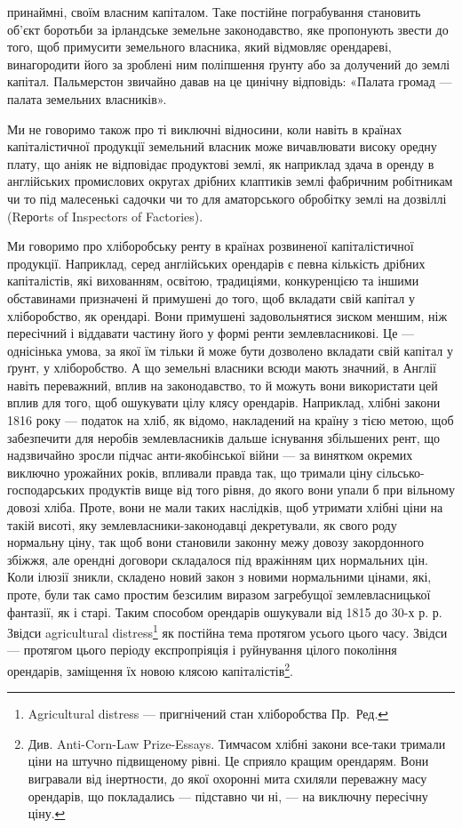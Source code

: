 \parcont{}  %
принаймні, своїм власним капіталом. Таке постійне пограбування становить об’єкт
боротьби за ірландське земельне законодавство, яке пропонують звести до того,
щоб примусити земельного власника, який відмовляє орендареві, винагородити
його за зроблені ним поліпшення ґрунту або за долучений до землі капітал.
Пальмерстон звичайно давав на це цинічну відповідь: «Палата громад — палата
земельних власників».

Ми не говоримо також про ті виключні відносини, коли навіть в країнах
капіталістичної продукції земельний власник може вичавлювати високу оредну
плату, що аніяк не відповідає продуктові землі, як наприклад здача в оренду
в англійських промислових округах дрібних клаптиків землі фабричним робітникам
чи то під малесенькі садочки чи то для аматорського обробітку землі на
дозвіллі (Rероrts of Inspectors of Factories).

Ми говоримо про хліборобську ренту в країнах розвиненої капіталістичної
продукції. Наприклад, серед англійських орендарів є певна кількість дрібних
капіталістів, які вихованням, освітою, традиціями, конкуренцією та іншими обставинами
призначені й примушені до того, щоб вкладати свій капітал у
хліборобство, як орендарі. Вони примушені задовольнятися зиском меншим,
ніж пересічний і віддавати частину його у формі ренти землевласникові. Це —
однісінька умова, за якої їм тільки й може бути дозволено вкладати свій
капітал у ґрунт, у хліборобство. А що земельні власники всюди мають значний,
в Англії навіть переважний, вплив на законодавство, то й можуть вони використати
цей вплив для того, щоб ошукувати цілу клясу орендарів. Наприклад,
хлібні закони 1816 року — податок на хліб, як відомо, накладений на
країну з тією метою, щоб забезпечити для неробів землевласників дальше існування
збільшених рент, що надзвичайно зросли підчас анти-якобінської війни —
за винятком окремих виключно урожайних років, впливали правда так, що тримали
ціну сільсько-господарських продуктів вище від того рівня, до якого вони
упали б при вільному довозі хліба. Проте, вони не мали таких наслідків, щоб
утримати хлібні ціни на такій висоті, яку землевласники-законодавці декретували,
як свого роду нормальну ціну, так щоб вони становили законну межу довозу
закордонного збіжжя, але орендні договори складалося під вражінням цих
нормальних цін. Коли ілюзії зникли, складено новий закон з новими нормальними
цінами, які, проте, були так само простим безсилим виразом загребущої
землевласницької фантазії, як і старі. Таким способом орендарів ошукували
від 1815 до 30-х р. р. Звідси agricultural distress\footnote*{
Agricultural distress — пригнічений стан хліборобства Пр.~Ред.
} як постійна тема протягом
усього цього часу. Звідси — протягом цього періоду експропріяція і руйнування
цілого покоління орендарів, заміщення їх новою клясою капіталістів\footnote{
Див. Anti-Corn-Law Prize-Essays. Тимчасом хлібні закони все-таки тримали ціни на штучно
підвищеному рівні. Це сприяло кращим орендарям. Вони вигравали від інертности, до якої охоронні
мита схиляли переважну масу орендарів, що покладались — підставно чи ні, — на виключну
пересічну ціну.
}.

